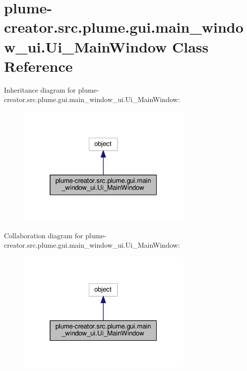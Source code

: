 \hypertarget{classplume-creator_1_1src_1_1plume_1_1gui_1_1main__window__ui_1_1_ui___main_window}{}\section{plume-\/creator.src.\+plume.\+gui.\+main\+\_\+window\+\_\+ui.\+Ui\+\_\+\+Main\+Window Class Reference}
\label{classplume-creator_1_1src_1_1plume_1_1gui_1_1main__window__ui_1_1_ui___main_window}


Inheritance diagram for plume-\/creator.src.\+plume.\+gui.\+main\+\_\+window\+\_\+ui.\+Ui\+\_\+\+Main\+Window\+:\nopagebreak
\begin{figure}[H]
\begin{center}
\leavevmode
\includegraphics[width=241pt]{classplume-creator_1_1src_1_1plume_1_1gui_1_1main__window__ui_1_1_ui___main_window__inherit__graph}
\end{center}
\end{figure}


Collaboration diagram for plume-\/creator.src.\+plume.\+gui.\+main\+\_\+window\+\_\+ui.\+Ui\+\_\+\+Main\+Window\+:\nopagebreak
\begin{figure}[H]
\begin{center}
\leavevmode
\includegraphics[width=241pt]{classplume-creator_1_1src_1_1plume_1_1gui_1_1main__window__ui_1_1_ui___main_window__coll__graph}
\end{center}
\end{figure}
